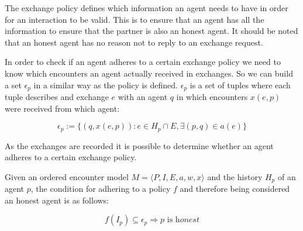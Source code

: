 The exchange policy defines which information an agent needs to have in order for an interaction to 
be valid. This is to ensure that an agent has all the information to ensure that the partner is also
an honest agent. It should be noted that an honest agent has no reason not to reply to an exchange 
request. 

In order to check if an agent adheres to a certain exchange policy we need to know which 
encounters an agent actually received in exchanges. So we can build a set $\epsilon_p$ in a similar
way as the policy is defined. $\epsilon_p$ is a set of tuples where each tuple describes and 
exchange $e$ with an agent $q$ in which encounters $x(e, p)$ were received from which agent: 

\[ \epsilon_p := \{ (q, x(e, p)) : e \in H_p \cap E,  \exists (p, q) \in a(e)\}\]

As the exchanges are recorded it is possible to determine whether an agent adheres to a certain 
exchange policy. 

\begin{defn}
    Given an ordered encounter model $M = \langle P, I, E, a, w, x \rangle$ and the history $H_p$ of an
    agent $p$, the condition for adhering to a policy $f$ and
    therefore being considered an honest agent is as follows: 

    \begin{equation}
        f(I_p) \subseteq \epsilon_p \Rightarrow p \text{ is } \textit{honest}
    \end{equation}
\end{defn}





